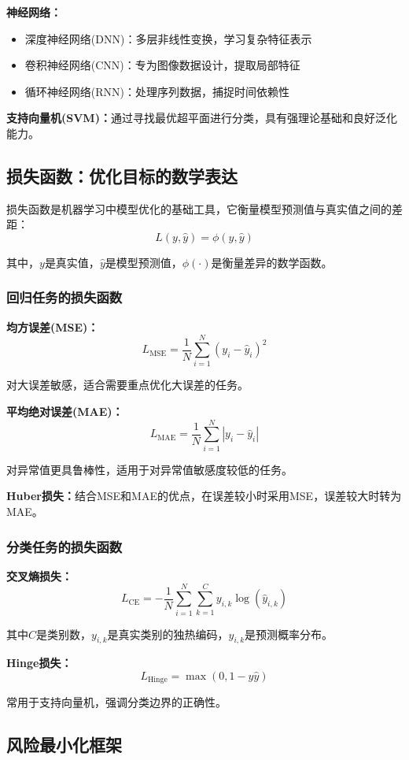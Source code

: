 \textbf{神经网络：}
\begin{itemize}
\item 深度神经网络(DNN)：多层非线性变换，学习复杂特征表示
\item 卷积神经网络(CNN)：专为图像数据设计，提取局部特征
\item 循环神经网络(RNN)：处理序列数据，捕捉时间依赖性
\end{itemize}

\textbf{支持向量机(SVM)：}通过寻找最优超平面进行分类，具有强理论基础和良好泛化能力。

\subsection{损失函数：优化目标的数学表达}

损失函数是机器学习中模型优化的基础工具，它衡量模型预测值与真实值之间的差距：
$$L(y, \hat{y}) = \phi(y, \hat{y})$$

其中，$y$是真实值，$\hat{y}$是模型预测值，$\phi(\cdot)$是衡量差异的数学函数。

\subsubsection{回归任务的损失函数}

\textbf{均方误差(MSE)：}
$$L_{\text{MSE}} = \frac{1}{N}\sum_{i=1}^N (y_i-\hat{y}_i)^2$$

对大误差敏感，适合需要重点优化大误差的任务。

\textbf{平均绝对误差(MAE)：}
$$L_{\text{MAE}} = \frac{1}{N}\sum_{i=1}^N |y_i-\hat{y}_i|$$

对异常值更具鲁棒性，适用于对异常值敏感度较低的任务。

\textbf{Huber损失：}结合MSE和MAE的优点，在误差较小时采用MSE，误差较大时转为MAE。

\subsubsection{分类任务的损失函数}

\textbf{交叉熵损失：}
$$L_{\text{CE}} = -\frac{1}{N}\sum_{i=1}^N\sum_{k=1}^C y_{i,k} \log(\hat{y}_{i,k})$$

其中$C$是类别数，$y_{i,k}$是真实类别的独热编码，$\hat{y}_{i,k}$是预测概率分布。

\textbf{Hinge损失：}
$$L_{\text{Hinge}} = \max(0, 1 - y\hat{y})$$

常用于支持向量机，强调分类边界的正确性。

\subsection{风险最小化框架}

